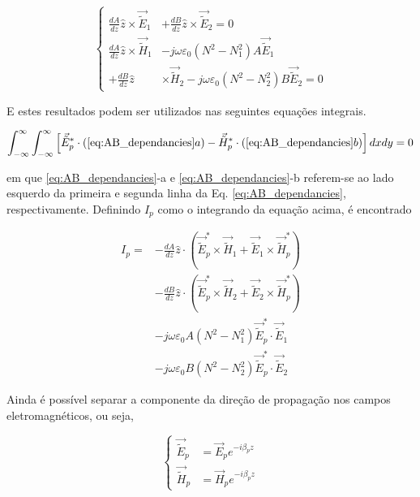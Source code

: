 \documentclass[final,12pt,times,twocolumn]{elsarticle}
\newcommand{\tildee}{ \vec{\tilde{E}}}
\newcommand{\tildeh}{ \vec{\tilde{H}}}
\newcommand{\epsz}{\varepsilon_0}
\begin{document}
\begin{equation}
    \left\{
    \begin{split}
        \frac{dA}{dz}\hat{z}\times\tildee_1 &+ \frac{dB}{dz}\hat{z}\times\tildee_2 = 0 \\
        \frac{dA}{dz}\hat{z}\times\tildeh_1 &-j\omega\epsz\left(N^2-N_1^2\right)A\tildee_1 \\
        + \frac{dB}{dz}\hat{z}&\times\tildeh_2 -j\omega\epsz\left(N^2-N_2^2\right)B\tildee_2 = 0
    \end{split}\right.
    \label{eq:AB_dependancies}
\end{equation}

E estes resultados podem ser utilizados nas seguintes equações integrais.

\begin{equation}
    \int_{-\infty}^\infty \int_{-\infty}^\infty \left[ \tildee_p^*\cdot (\ref{eq:AB_dependancies}a) - \tildeh_p^*\cdot(\ref{eq:AB_dependancies}b) \right] dxdy = 0
    \label{eq:integral_equations}
\end{equation}

em que \eqref{eq:AB_dependancies}-a e \eqref{eq:AB_dependancies}-b referem-se ao lado esquerdo da primeira e segunda linha da Eq. \eqref{eq:AB_dependancies}, respectivamente. Definindo $I_p$ como o integrando da equação acima, é encontrado

\begin{equation}\label{eq:I_p}
\begin{split}
I_p = &- \frac{dA}{dz}\hat{z}\cdot\left( \tildee_p^*\times\tildeh_1 + \tildee_1\times\tildeh_p^*\right) \\
& - \frac{dB}{dz}\hat{z}\cdot\left( \tildee_p^*\times\tildeh_2 + \tildee_2\times\tildeh_p^*\right) \\
& - j\omega\epsz A\left(N^2-N_1^2\right)\tildee_p^*\cdot\tildee_1 \\
& - j\omega\epsz B\left(N^2-N_2^2\right)\tildee_p^*\cdot\tildee_2
\end{split}
\end{equation}

Ainda é possível separar a componente da direção de propagação nos campos eletromagnéticos, ou seja,

\begin{equation*}
    \left\{
    \begin{split}
        \tildee_p &= \vec{E}_pe^{-i\beta_p z} \\
        \tildeh_p &= \vec{H}_pe^{-i\beta_p z}
    \end{split}
    \right.
\end{equation*}
\end{document}
